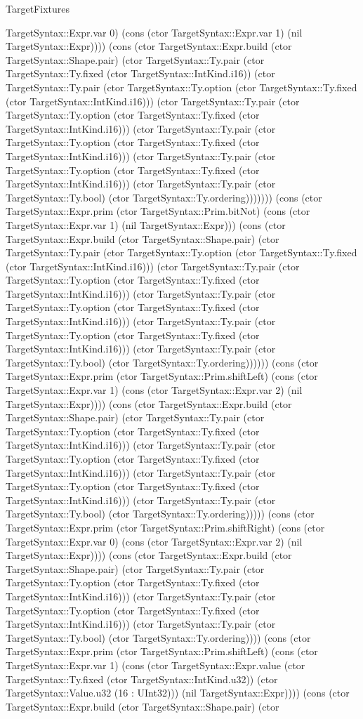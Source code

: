 \begin{lexlean}{TargetFixtures}
\begin{semanticmodule}
{TargetSyntax::Expr.var 0) (cons (ctor TargetSyntax::Expr.var 1) (nil TargetSyntax::Expr)))) (cons (ctor TargetSyntax::Expr.build (ctor TargetSyntax::Shape.pair) (ctor TargetSyntax::Ty.pair (ctor TargetSyntax::Ty.fixed (ctor TargetSyntax::IntKind.i16)) (ctor TargetSyntax::Ty.pair (ctor TargetSyntax::Ty.option (ctor TargetSyntax::Ty.fixed (ctor TargetSyntax::IntKind.i16))) (ctor TargetSyntax::Ty.pair (ctor TargetSyntax::Ty.option (ctor TargetSyntax::Ty.fixed (ctor TargetSyntax::IntKind.i16))) (ctor TargetSyntax::Ty.pair (ctor TargetSyntax::Ty.option (ctor TargetSyntax::Ty.fixed (ctor TargetSyntax::IntKind.i16))) (ctor TargetSyntax::Ty.pair (ctor TargetSyntax::Ty.option (ctor TargetSyntax::Ty.fixed (ctor TargetSyntax::IntKind.i16))) (ctor TargetSyntax::Ty.pair (ctor TargetSyntax::Ty.bool) (ctor TargetSyntax::Ty.ordering))))))) (cons (ctor TargetSyntax::Expr.prim (ctor TargetSyntax::Prim.bitNot) (cons (ctor TargetSyntax::Expr.var 1) (nil TargetSyntax::Expr))) (cons (ctor TargetSyntax::Expr.build (ctor TargetSyntax::Shape.pair) (ctor TargetSyntax::Ty.pair (ctor TargetSyntax::Ty.option (ctor TargetSyntax::Ty.fixed (ctor TargetSyntax::IntKind.i16))) (ctor TargetSyntax::Ty.pair (ctor TargetSyntax::Ty.option (ctor TargetSyntax::Ty.fixed (ctor TargetSyntax::IntKind.i16))) (ctor TargetSyntax::Ty.pair (ctor TargetSyntax::Ty.option (ctor TargetSyntax::Ty.fixed (ctor TargetSyntax::IntKind.i16))) (ctor TargetSyntax::Ty.pair (ctor TargetSyntax::Ty.option (ctor TargetSyntax::Ty.fixed (ctor TargetSyntax::IntKind.i16))) (ctor TargetSyntax::Ty.pair (ctor TargetSyntax::Ty.bool) (ctor TargetSyntax::Ty.ordering)))))) (cons (ctor TargetSyntax::Expr.prim (ctor TargetSyntax::Prim.shiftLeft) (cons (ctor TargetSyntax::Expr.var 1) (cons (ctor TargetSyntax::Expr.var 2) (nil TargetSyntax::Expr)))) (cons (ctor TargetSyntax::Expr.build (ctor TargetSyntax::Shape.pair) (ctor TargetSyntax::Ty.pair (ctor TargetSyntax::Ty.option (ctor TargetSyntax::Ty.fixed (ctor TargetSyntax::IntKind.i16))) (ctor TargetSyntax::Ty.pair (ctor TargetSyntax::Ty.option (ctor TargetSyntax::Ty.fixed (ctor TargetSyntax::IntKind.i16))) (ctor TargetSyntax::Ty.pair (ctor TargetSyntax::Ty.option (ctor TargetSyntax::Ty.fixed (ctor TargetSyntax::IntKind.i16))) (ctor TargetSyntax::Ty.pair (ctor TargetSyntax::Ty.bool) (ctor TargetSyntax::Ty.ordering))))) (cons (ctor TargetSyntax::Expr.prim (ctor TargetSyntax::Prim.shiftRight) (cons (ctor TargetSyntax::Expr.var 0) (cons (ctor TargetSyntax::Expr.var 2) (nil TargetSyntax::Expr)))) (cons (ctor TargetSyntax::Expr.build (ctor TargetSyntax::Shape.pair) (ctor TargetSyntax::Ty.pair (ctor TargetSyntax::Ty.option (ctor TargetSyntax::Ty.fixed (ctor TargetSyntax::IntKind.i16))) (ctor TargetSyntax::Ty.pair (ctor TargetSyntax::Ty.option (ctor TargetSyntax::Ty.fixed (ctor TargetSyntax::IntKind.i16))) (ctor TargetSyntax::Ty.pair (ctor TargetSyntax::Ty.bool) (ctor TargetSyntax::Ty.ordering)))) (cons (ctor TargetSyntax::Expr.prim (ctor TargetSyntax::Prim.shiftLeft) (cons (ctor TargetSyntax::Expr.var 1) (cons (ctor TargetSyntax::Expr.value (ctor TargetSyntax::Ty.fixed (ctor TargetSyntax::IntKind.u32)) (ctor TargetSyntax::Value.u32 (16 : UInt32))) (nil TargetSyntax::Expr)))) (cons (ctor TargetSyntax::Expr.build (ctor TargetSyntax::Shape.pair) (ctor }
\end{semanticmodule}
\end{lexlean}
